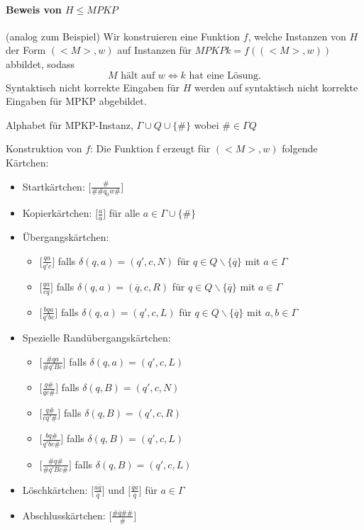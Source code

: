 \paragraph*{Beweis von $H \leq MPKP$} (analog zum Beispiel) Wir konstruieren eine Funktion $f$, welche Instanzen von $H$ der Form $(<M>,w)$ auf Instanzen für $MPKP k=f((<M>,w))$ abbildet, sodass $$ M \text{ hält auf } w \Leftrightarrow k \text{ hat eine Lösung.}$$ Syntaktisch nicht korrekte Eingaben für $H$ werden auf syntaktisch nicht korrekte Eingaben für MPKP abgebildet.

\par\medskip Alphabet für MPKP-Instanz, $\Gamma \cup Q \cup \{\#\}$ wobei $\#\in\Gamma Q$

\par\medskip Konstruktion von $f$: Die Funktion f erzeugt für $(<M>,w)$ folgende Kärtchen:

\begin{itemize}
	\item[] Startkärtchen: $\Big[ \frac{\#}{\#\#q_0 w\#} \Big]$
	\item[] Kopierkärtchen: $\Big[ \frac{a}{a} \Big]$ für alle $a \in \Gamma \cup \{\#\}$
	\item[] Übergangskärtchen: 
	\begin{itemize}
		\item[] $\Big[ \frac{qa}{q'c} \Big]$ falls $\delta(q,a)=(q',c,N)$ für $q \in Q\backslash\{\overline{q}\}$ mit $a \in \Gamma$
		\item[] $\Big[ \frac{qa}{c\overline{q}} \Big]$ falls $\delta(q,a)=(\overline{q},c,R)$ für $q \in Q\backslash\{\overline{q}\}$ mit $a \in \Gamma$
		\item[] $\Big[ \frac{bqa}{q'bc} \Big]$ falls $\delta(q,a)=(q',c,L)$ für $q \in Q\backslash\{\overline{q}\}$ mit $a,b \in \Gamma$
	\end{itemize}
	\item[] Spezielle Randübergangskärtchen:
	\begin{itemize}
		\item[] $\Big[ \frac{\#qa}{\#q'Bc} \Big]$ falls $\delta(q,a)=(q',c,L)$
		\item[] $\Big[ \frac{q\#}{\overline{q}c\#} \Big]$ falls $\delta(q,B)=(q',c,N)$
		\item[] $\Big[ \frac{q\#}{cq'\#} \Big]$ falls $\delta(q,B)=(q',c,R)$
		\item[] $\Big[ \frac{bq\#}{q'bc\#} \Big]$ falls $\delta(q,B)=(q',c,L)$
		\item[] $\Big[ \frac{\#q\#}{\#q'Bc\#} \Big]$ falls $\delta(q,B)=(q',c,L)$
	\end{itemize}
	\item[] Löschkärtchen: $\Big[ \frac{a\overline{q}}{\overline{q}} \Big]$ und $\Big[ \frac{\overline{q}a}{\overline{q}} \Big]$ für $a \in \Gamma$
	\item[] Abschlusskärtchen: $\Big[ \frac{\#\overline{q}\#\#}{\#} \Big]$
\end{itemize}

